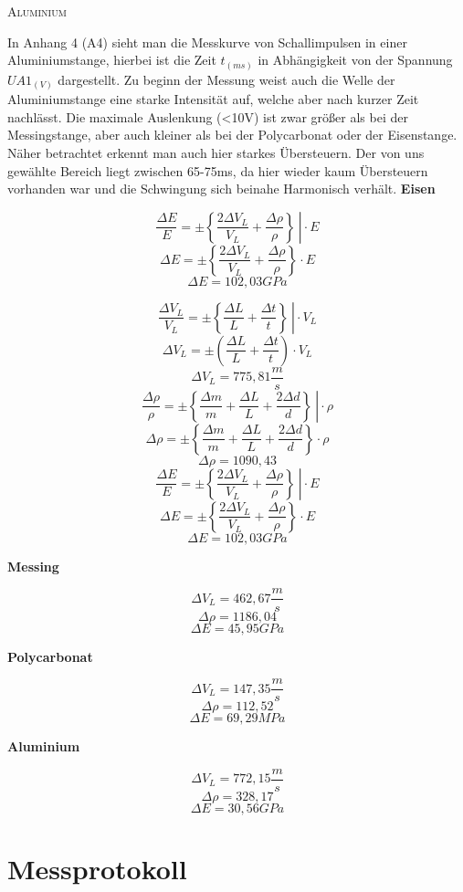 \documentclass[11pt, a4paper]{article}
\begin{document}
\begin{center}
\textsc{Aluminium}
\end{center}

In Anhang 4 (A4) sieht man die Messkurve von Schallimpulsen in einer Aluminiumstange, hierbei ist die Zeit $t_{(ms)}$ in Abhängigkeit von der Spannung $UA1_{(V)}$ dargestellt. Zu beginn der Messung weist auch die Welle der Aluminiumstange eine starke Intensität auf, welche aber nach kurzer Zeit nachlässt. Die maximale Auslenkung (<10V) ist zwar größer als bei der Messingstange, aber auch kleiner als bei der Polycarbonat oder der Eisenstange. Näher betrachtet erkennt man auch hier starkes Übersteuern. Der von uns gewählte Bereich liegt zwischen 65-75ms, da hier wieder kaum Übersteuern vorhanden war und die Schwingung sich beinahe Harmonisch verhält.\newpage
\textbf{Eisen}

$$\left. \frac{\Delta E}{E}=\pm \left\{ \frac{2\Delta V_L}{V_L}+\frac{\Delta\rho}{\rho}\right\}\ \right|\cdot E$$
$$\Delta E = \pm \left\{ \frac{2\Delta V_L}{V_L}+\frac{\Delta\rho}{\rho}\right\}\cdot E$$
$$\Delta E = 102,03 GPa$$

$$\left. \frac{\Delta V_L}{V_L}=\pm \left\{ \frac{\Delta L}{L} + \frac{\Delta t}{t} \right\}\ \right|  \cdot V_L$$
$$\Delta V_L=\pm \left( \frac{\Delta L}{L} + \frac{\Delta t}{t} \right)\cdot V_L$$
$$\Delta V_L=775,81 \frac{m}{s}$$
$$\left. \frac{\Delta \rho}{\rho}=\pm \left\{ \frac{\Delta m}{m} + \frac{\Delta L}{L} + \frac{2\Delta d}{d} \right\}\ \right|  \cdot \rho$$
$$\Delta \rho=\pm \left\{ \frac{\Delta m}{m} + \frac{\Delta L}{L} + \frac{2\Delta d}{d} \right\}\cdot \rho$$
$$\Delta \rho = 1090,43$$
$$\left. \frac{\Delta E}{E}=\pm \left\{ \frac{2\Delta V_L}{V_L} + \frac{\Delta \rho}{\rho	}\right\}\ \right| \cdot E$$
$$\Delta E=\pm \left\{ \frac{2\Delta V_L}{V_L} + \frac{\Delta \rho}{\rho	}\right\}\cdot E$$
$$\Delta E = 102,03 GPa$$

\textbf{Messing}

$$\Delta V_L = 462,67 \frac{m}{s}$$
$$\Delta \rho = 1186,04$$
$$\Delta E  = 45,95 GPa$$

\textbf{Polycarbonat}

$$\Delta V_L = 147,35 \frac{m}{s}$$
$$\Delta \rho = 112,52$$
$$\Delta E  = 69,29 MPa$$

\textbf{Aluminium}

$$\Delta V_L = 772,15 \frac{m}{s}$$
$$\Delta \rho = 328,17 $$
$$\Delta E  = 30,56 GPa$$


\newpage
\section{Messprotokoll}
\end{document}

